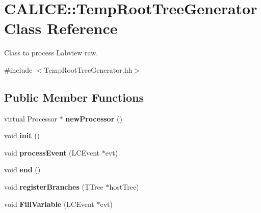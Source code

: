 \section{CALICE::TempRootTreeGenerator Class Reference}
\label{classCALICE_1_1TempRootTreeGenerator}


Class to process Labview raw.  


{\ttfamily \#include $<$TempRootTreeGenerator.hh$>$}\subsection*{Public Member Functions}
\begin{DoxyCompactItemize}
\item 
virtual Processor $\ast$ {\bfseries newProcessor} ()\label{classCALICE_1_1TempRootTreeGenerator_a4683c88fa11fdadc38b174cbd78191df}

\item 
void {\bfseries init} ()\label{classCALICE_1_1TempRootTreeGenerator_a0a85ca935c8d4227cf78ff85745c801f}

\item 
void {\bfseries processEvent} (LCEvent $\ast$evt)\label{classCALICE_1_1TempRootTreeGenerator_affbf92f531b40ab279bec5764dd798b2}

\item 
void {\bfseries end} ()\label{classCALICE_1_1TempRootTreeGenerator_aebdde734f7d29091114a7c5da186e06f}

\item 
void {\bfseries registerBranches} (TTree $\ast$hostTree)\label{classCALICE_1_1TempRootTreeGenerator_a8c8c4c7c423b1aa404028e59960ba771}

\item 
void {\bfseries FillVariable} (LCEvent $\ast$evt)\label{classCALICE_1_1TempRootTreeGenerator_a3544386c3f78d68615da0c01f437e35e}

\end{DoxyCompactItemize}
